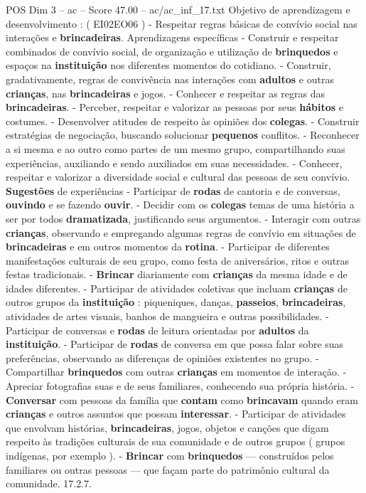 \begin{textsample}{POS Dim 3 – ac – Score 47.00 – ac/ac\_inf\_17.txt}
Objetivo de aprendizagem e desenvolvimento : ( EI02EO06 ) - Respeitar regras básicas de convívio social nas interações e \textbf{brincadeiras}.
Aprendizagens específicas - Construir e respeitar combinados de convívio social, de organização e utilização de \textbf{brinquedos} e espaços na \textbf{instituição} nos diferentes momentos do cotidiano. - Construir, gradativamente, regras de convivência nas interações com \textbf{adultos} e outras \textbf{crianças}, nas \textbf{brincadeiras} e jogos. - Conhecer e respeitar as regras das \textbf{brincadeiras}. - Perceber, respeitar e valorizar as pessoas por seus \textbf{hábitos} e costumes. - Desenvolver atitudes de respeito às opiniões dos \textbf{colegas}. - Construir estratégias de negociação, buscando solucionar \textbf{pequenos} conflitos. - Reconhecer a si mesma e ao outro como partes de um mesmo grupo, compartilhando suas experiências, auxiliando e sendo auxiliados em suas necessidades. - Conhecer, respeitar e valorizar a diversidade social e cultural das pessoas de seu convívio. \textbf{Sugestões} de experiências - Participar de \textbf{rodas} de cantoria e de conversas, \textbf{ouvindo} e se fazendo \textbf{ouvir}. - Decidir com os \textbf{colegas} temas de uma história a ser por todos \textbf{dramatizada}, justificando seus argumentos. - Interagir com outras \textbf{crianças}, observando e empregando algumas regras de convívio em situações de \textbf{brincadeiras} e em outros momentos da \textbf{rotina}. - Participar de diferentes manifestações culturais de seu grupo, como festa de aniversários, ritos e outras festas tradicionais. - \textbf{Brincar} diariamente com \textbf{crianças} da mesma idade e de idades diferentes. - Participar de atividades coletivas que incluam \textbf{crianças} de outros grupos da \textbf{instituição} : piqueniques, danças, \textbf{passeios}, \textbf{brincadeiras}, atividades de artes visuais, banhos de mangueira e outras possibilidades. - Participar de conversas e \textbf{rodas} de leitura orientadas por \textbf{adultos} da \textbf{instituição}. - Participar de \textbf{rodas} de conversa em que possa falar sobre suas preferências, observando as diferenças de opiniões existentes no grupo. - Compartilhar \textbf{brinquedos} com outras \textbf{crianças} em momentos de interação. - Apreciar fotografias suas e de seus familiares, conhecendo sua própria história. - \textbf{Conversar} com pessoas da família que \textbf{contam} como \textbf{brincavam} quando eram \textbf{crianças} e outros assuntos que possam \textbf{interessar}. - Participar de atividades que envolvam histórias, \textbf{brincadeiras}, jogos, objetos e canções que digam respeito às tradições culturais de sua comunidade e de outros grupos ( grupos indígenas, por exemplo ). - \textbf{Brincar} com \textbf{brinquedos} — construídos pelos familiares ou outras pessoas — que façam parte do patrimônio cultural da comunidade. 17.2.7.

\end{textsample}
